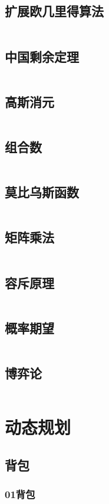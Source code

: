 \documentclass[a4paper,12pt]{article}
\begin{document}
\subsection{扩展欧几里得算法}
\inputminted[breaklines, linenos]{c++}{math/exgcd.cc}
\subsection{中国剩余定理}
\inputminted[breaklines, linenos]{c++}{math/crt.cc}
\subsection{高斯消元}
\inputminted[breaklines, linenos]{c++}{math/gauss.cc}
\subsection{组合数}
\inputminted[breaklines, linenos]{c++}{math/combine.cc}
\subsection{莫比乌斯函数}
\inputminted[breaklines, linenos]{c++}{math/mobius.cc}
\subsection{矩阵乘法}
\inputminted[breaklines, linenos]{c++}{math/matrix.cc}
\subsection{容斥原理}
\inputminted[breaklines, linenos]{c++}{math/rongchi.cc}
\subsection{概率期望}
\inputminted[breaklines, linenos]{c++}{math/qiwang.cc}
\subsection{博弈论}
\inputminted[breaklines, linenos]{c++}{math/game.cc}

\newpage
\section{动态规划}
\subsection{背包}
\subsubsection{01背包}
\end{document}
